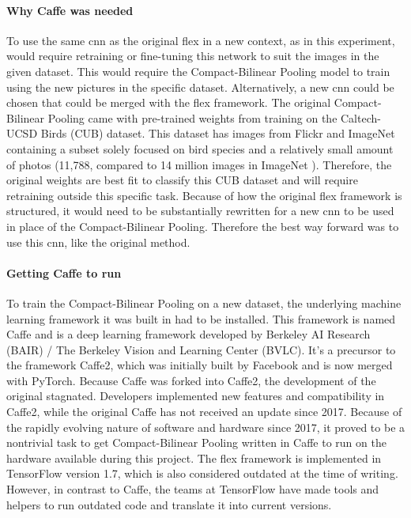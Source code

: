             \paragraph{Why Caffe was needed\\}
            To use the same \gls{cnn} as the original \gls{flex} in a new context, as in this experiment, would require retraining or fine-tuning this network to suit the images in the given dataset. This would require the Compact-Bilinear Pooling model to train using the new pictures in the specific dataset. Alternatively, a new \gls{cnn} could be chosen that could be merged with the \gls{flex} framework. The original Compact-Bilinear Pooling came with pre-trained weights from training on the Caltech-UCSD Birds (CUB) \cite{PeronaLabCUB2002011} dataset. This dataset has images from Flickr and ImageNet containing a subset solely focused on bird species and a relatively small amount of photos (11,788, compared to 14 million images in ImageNet \cite{dengImageNetLargeScaleHierarchical2009}). Therefore, the original weights are best fit to classify this CUB dataset and will require retraining outside this specific task.
            Because of how the original \gls{flex} framework is structured, it would need to be substantially rewritten for a new \gls{cnn} to be used in place of the Compact-Bilinear Pooling. Therefore the best way forward was to use this \gls{cnn}, like the original method.

            \paragraph{Getting Caffe to run\\}
            To train the Compact-Bilinear Pooling on a new dataset, the underlying machine learning framework it was built in had to be installed.
            This framework is named Caffe and is a deep learning framework developed by Berkeley AI Research (BAIR) / The Berkeley Vision and Learning Center (BVLC). It's a precursor to the framework  Caffe2, which was initially built by Facebook and is now merged with PyTorch. Because Caffe was forked into Caffe2, the development of the original stagnated. Developers implemented new features and compatibility in Caffe2, while the original Caffe has not received an update since 2017. 
            Because of the rapidly evolving nature of software and hardware since 2017, it proved to be a nontrivial task to get Compact-Bilinear Pooling written in Caffe to run on the hardware available during this project.
            The \gls{flex} framework is implemented in TensorFlow version 1.7, which is also considered outdated at the time of writing. However, in contrast to Caffe, the teams at TensorFlow have made tools and helpers to run outdated code and translate it into current versions.


